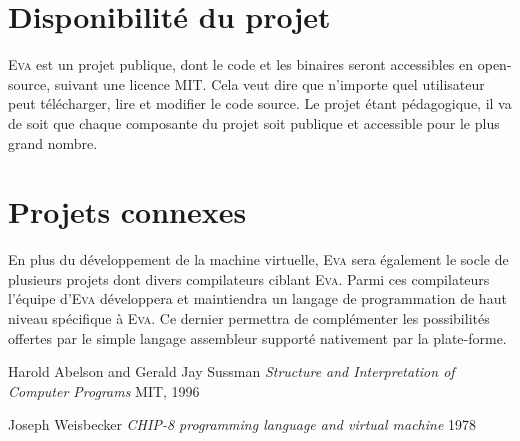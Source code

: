 \documentclass[11pt,twoside]{article}
\newcommand{\noun}[1]{\textsc{#1}}
\begin{document}
\section{Disponibilité du projet}

\noun{Eva} est un projet publique, dont le code et les binaires seront
accessibles en open-source, suivant une licence MIT. Cela veut dire
que n'importe quel utilisateur peut télécharger, lire et modifier
le code source. Le projet étant pédagogique, il va de soit que chaque
composante du projet soit publique et accessible pour le plus grand nombre.

\section{Projets connexes}

En plus du développement de la machine virtuelle, \noun{Eva} sera
également le socle de plusieurs projets dont divers compilateurs ciblant
\noun{Eva}. Parmi ces compilateurs l'équipe d'\noun{Eva} développera et maintiendra
un langage de programmation de haut niveau spécifique à \noun{Eva}. Ce dernier
permettra de complémenter les possibilités offertes par le simple langage
assembleur supporté nativement par la plate-forme.

\newpage{}

\clearpage{}

\begin{thebibliography}{XXXXXX}
  \label{chap:bib}

   Harold Abelson and Gerald Jay Sussman
  \emph{Structure and Interpretation of Computer Programs} MIT, 1996

   Joseph Weisbecker
  \emph{CHIP-8 programming language and virtual machine} 1978

\end{thebibliography}
\end{document}
